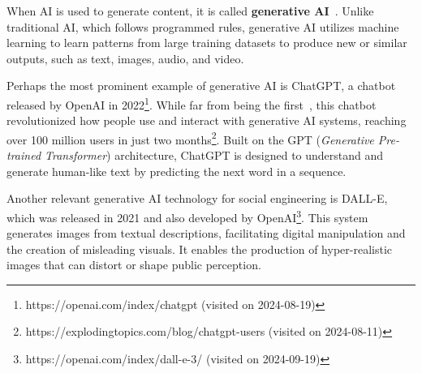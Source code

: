 When AI is used to generate content, it is called \textbf{generative AI}~\citep{goodfellow_Generative_Adversarial_Networks_2020}. Unlike traditional AI, which follows programmed rules, generative AI utilizes machine learning to learn patterns from large training datasets to produce new or similar outputs, such as text, images, audio, and video.

Perhaps the most prominent example of generative AI is ChatGPT, a chatbot released by OpenAI in 2022\footnote{https://openai.com/index/chatgpt (visited on 2024-08-19)}. While far from being the first~\citep{weizenbaum_ELIZA_1996}, this chatbot revolutionized how people use and interact with generative AI systems, reaching over 100 million users in just two months\footnote{https://explodingtopics.com/blog/chatgpt-users (visited on 2024-08-11)}. Built on the GPT (\textit{Generative Pre-trained Transformer}) architecture, ChatGPT is designed to understand and generate human-like text by predicting the next word in a sequence.

Another relevant generative AI technology for social engineering is DALL-E, which was released in 2021 and also developed by OpenAI\footnote{https://openai.com/index/dall-e-3/ (visited on 2024-09-19)}. This system generates images from textual descriptions, facilitating digital manipulation and the creation of misleading visuals. It enables the production of hyper-realistic images that can distort or shape public perception.
